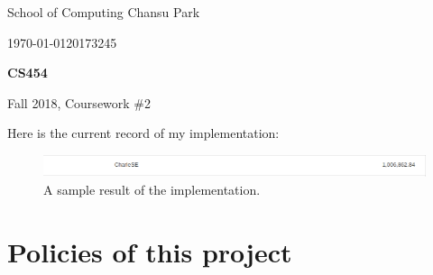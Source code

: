 \documentclass[11pt]{article}
\begin{document}
 



{\large
\noindent School of Computing %
\hfill Chansu Park %

\vspace{.1in}

\noindent \today \hfill 20173245}

\vspace{.25in}

\Large{
\begin{center}
\textbf{CS454}

Fall 2018, Coursework \#2
\end{center}
}

\large

Here is the current record of my implementation:
\begin{figure}[htb]
	\begin{center}
		\includegraphics[width=0.8\linewidth]{record.png}
	\end{center}
	\caption{A sample result of the implementation.}
\end{figure}

\section{Policies of this project} \label{sec:1}
\end{document}
